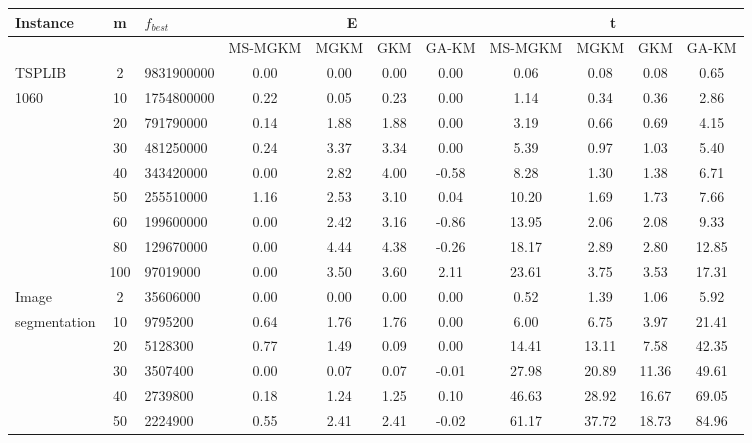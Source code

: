 {\scriptsize
\centering
\begin{longtable}{@{}lclcccccccc@{}}
\toprule
Instance     & m   & $f_{best}$    & \multicolumn{4}{c}{E}         & \multicolumn{4}{c}{t}                 \\ \midrule
             &     &               & MS-MGKM & MGKM & GKM  & GA-KM & MS-MGKM & MGKM    & GKM     & GA-KM   \\
TSPLIB       & 2   & 9831900000    & 0.00    & 0.00 & 0.00 & 0.00  & 0.06    & 0.08    & 0.08    & 0.65    \\
1060         & 10  & 1754800000    & 0.22    & 0.05 & 0.23 & 0.00  & 1.14    & 0.34    & 0.36    & 2.86    \\
             & 20  & 791790000     & 0.14    & 1.88 & 1.88 & 0.00  & 3.19    & 0.66    & 0.69    & 4.15    \\
             & 30  & 481250000     & 0.24    & 3.37 & 3.34 & 0.00  & 5.39    & 0.97    & 1.03    & 5.40    \\
             & 40  & 343420000     & 0.00    & 2.82 & 4.00 & -0.58 & 8.28    & 1.30    & 1.38    & 6.71    \\
             & 50  & 255510000     & 1.16    & 2.53 & 3.10 & 0.04  & 10.20   & 1.69    & 1.73    & 7.66    \\
             & 60  & 199600000     & 0.00    & 2.42 & 3.16 & -0.86 & 13.95   & 2.06    & 2.08    & 9.33    \\
             & 80  & 129670000     & 0.00    & 4.44 & 4.38 & -0.26 & 18.17   & 2.89    & 2.80    & 12.85   \\
             & 100 & 97019000      & 0.00    & 3.50 & 3.60 & 2.11  & 23.61   & 3.75    & 3.53    & 17.31   \\ \hline
Image        & 2   & 35606000      & 0.00    & 0.00 & 0.00 & 0.00  & 0.52    & 1.39    & 1.06    & 5.92    \\
segmentation & 10  & 9795200       & 0.64    & 1.76 & 1.76 & 0.00  & 6.00    & 6.75    & 3.97    & 21.41   \\
             & 20  & 5128300       & 0.77    & 1.49 & 0.09 & 0.00  & 14.41   & 13.11   & 7.58    & 42.35   \\
             & 30  & 3507400       & 0.00    & 0.07 & 0.07 & -0.01 & 27.98   & 20.89   & 11.36   & 49.61   \\
             & 40  & 2739800       & 0.18    & 1.24 & 1.25 & 0.10  & 46.63   & 28.92   & 16.67   & 69.05   \\
             & 50  & 2224900       & 0.55    & 2.41 & 2.41 & -0.02 & 61.17   & 37.72   & 18.73   & 84.96   \\

\end{longtable}}

